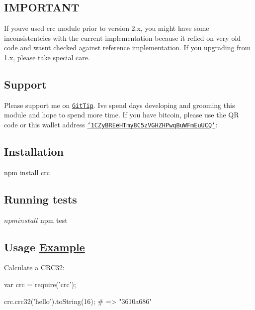\subsection*{I\+M\+P\+O\+R\+T\+A\+N\+T}

If you\textquotesingle{}ve used {\ttfamily crc} module prior to version 2.\+x, you might have some inconsistentcies with the current implementation because it relied on very old code and wasn\textquotesingle{}t checked against reference implementation. If you upgrading from 1.\+x, please take special care.

\subsection*{Support}

\href{https://blockchain.info/address/1CZyBREeHTmy8C5zVGHZHPwqBuWFmEuUCQ}{\tt } Please support me on \href{https://www.gittip.com/alexgorbatchev/}{\tt Git\+Tip}. I\textquotesingle{}ve spend days developing and grooming this module and hope to spend more time. If you have bitcoin, please use the Q\+R code or this wallet address \href{https://blockchain.info/address/1CZyBREeHTmy8C5zVGHZHPwqBuWFmEuUCQ}{\tt `1\+C\+Zy\+B\+R\+Ee\+H\+Tmy8\+C5z\+V\+G\+H\+Z\+H\+Pwq\+Bu\+W\+Fm\+Eu\+U\+C\+Q`}\+:

\subsection*{Installation}

\begin{DoxyVerb}npm install crc
\end{DoxyVerb}


\subsection*{Running tests}

\begin{DoxyVerb}$ npm install
$ npm test
\end{DoxyVerb}


\subsection*{Usage \hyperlink{struct_example}{Example}}

Calculate a C\+R\+C32\+: \begin{DoxyVerb}var crc = require('crc');

crc.crc32('hello').toString(16);
# => "3610a686"
\end{DoxyVerb}


